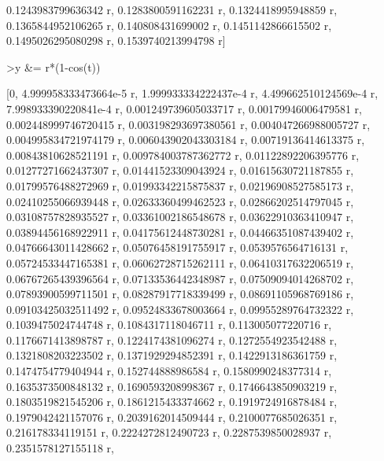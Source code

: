 \documentclass[12pt,Times new roman,letterpaper]{book}
\begin{document}
\begin{eulernootebook}
\begin{eulercomment}
\begin{eulercomment}
\begin{eulernootebook}
\begin{eulercomment}
\begin{eulercomment}
\begin{eulercomment}
\begin{eulercomment}
\begin{eulercomment}
\begin{eulercomment}
\begin{eulernotebook}
\begin{eulercomment}
\begin{eulercomment}
\begin{eulercomment}
\begin{eulercomment}
\begin{eulercomment}
\begin{eulercomment}
\begin{eulercomment}
\begin{eulercomment}
\begin{eulercomment}
\begin{eulercomment}
\begin{eulercomment}
\begin{eulercomment}
\begin{eulercomment}
\begin{eulercomment}
\begin{eulercomment}
\begin{eulercomment}
\begin{euleroutput}
  0.1243983799636342 r, 0.1283800591162231 r, 0.1324418995948859 r, 
  0.1365844952106265 r, 0.140808431699002 r, 0.1451142866615502 r, 
  0.1495026295080298 r, 0.1539740213994798 r]
  
\end{euleroutput}
\begin{eulerprompt}
>y &= r*(1-cos(t))
\end{eulerprompt}
\begin{euleroutput}
  
          [0, 4.999958333473664e-5 r, 1.999933334222437e-4 r, 
  4.499662510124569e-4 r, 7.998933390220841e-4 r, 
  0.001249739605033717 r, 0.00179946006479581 r, 
  0.002448999746720415 r, 0.003198293697380561 r, 
  0.004047266988005727 r, 0.004995834721974179 r, 
  0.006043902043303184 r, 0.00719136414613375 r, 0.00843810628521191 r, 
  0.009784003787362772 r, 0.01122892206395776 r, 0.01277271662437307 r, 
  0.01441523309043924 r, 0.01615630721187855 r, 0.01799576488272969 r, 
  0.01993342215875837 r, 0.02196908527585173 r, 0.02410255066939448 r, 
  0.02633360499462523 r, 0.02866202514797045 r, 0.03108757828935527 r, 
  0.03361002186548678 r, 0.03622910363410947 r, 0.03894456168922911 r, 
  0.04175612448730281 r, 0.04466351087439402 r, 0.04766643011428662 r, 
  0.05076458191755917 r, 0.0539576564716131 r, 0.05724533447165381 r, 
  0.06062728715262111 r, 0.06410317632206519 r, 0.06767265439396564 r, 
  0.07133536442348987 r, 0.07509094014268702 r, 0.07893900599711501 r, 
  0.08287917718339499 r, 0.08691105968769186 r, 0.09103425032511492 r, 
  0.09524833678003664 r, 0.09955289764732322 r, 0.1039475024744748 r, 
  0.1084317118046711 r, 0.113005077220716 r, 0.1176671413898787 r, 
  0.1224174381096274 r, 0.1272554923542488 r, 0.1321808203223502 r, 
  0.1371929294852391 r, 0.1422913186361759 r, 0.1474754779404944 r, 
  0.152744888986584 r, 0.1580990248377314 r, 0.1635373500848132 r, 
  0.1690593208998367 r, 0.1746643850903219 r, 0.1803519821545206 r, 
  0.1861215433374662 r, 0.1919724916878484 r, 0.1979042421157076 r, 
  0.2039162014509444 r, 0.2100077685026351 r, 0.216178334119151 r, 
  0.2224272812490723 r, 0.2287539850028937 r, 0.2351578127155118 r, 

\end{euleroutput}
\end{eulercomment}
\end{eulercomment}
\end{eulercomment}
\end{eulercomment}
\end{eulercomment}
\end{eulercomment}
\end{eulercomment}
\end{eulercomment}
\end{eulercomment}
\end{eulercomment}
\end{eulercomment}
\end{eulercomment}
\end{eulercomment}
\end{eulercomment}
\end{eulercomment}
\end{eulercomment}
\end{eulernotebook}
\end{eulercomment}
\end{eulercomment}
\end{eulercomment}
\end{eulercomment}
\end{eulercomment}
\end{eulercomment}
\end{eulernootebook}
\end{eulercomment}
\end{eulercomment}
\end{eulernootebook}
\end{document}
